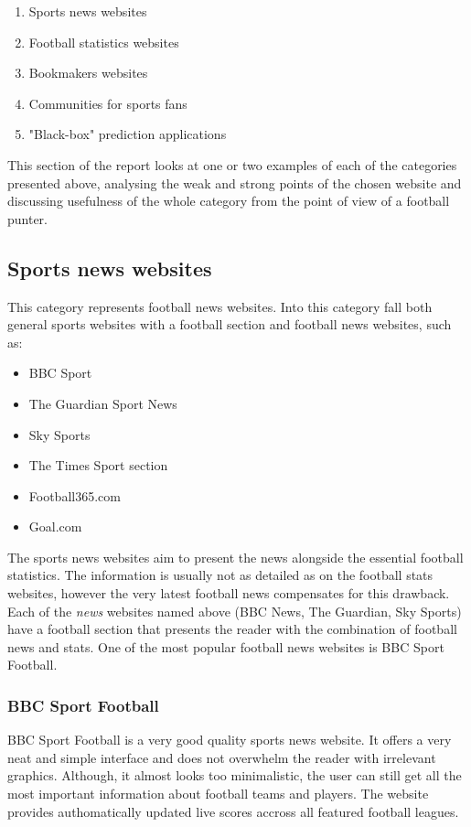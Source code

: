 \begin{enumerate}
	\item Sports news websites
	\item Football statistics websites
	\item Bookmakers websites 
	\item Communities for sports fans
	\item "Black-box" prediction applications
\end{enumerate}

This section of the report looks at one or two examples of each of the categories presented above, analysing the weak and strong points of the chosen website and discussing usefulness of the whole category from the point of view of a football punter.
	
\subsection{Sports news websites}
\label{subsec:sportsnewswebsites_req}
This category represents football news websites. Into this category fall both general sports websites with a football section and football news websites, such as:
	
\begin{itemize}
	 \item BBC Sport \citep{source:bbcsport}
	 \item The Guardian Sport News \citep{source:guardiansport}
	 \item Sky Sports \citep{source:skysports}
	 \item The Times Sport section \citep{source:thetimes}
	 \item Football365.com \citep{source:football365}
	 \item Goal.com \citep{source:goal}
\end{itemize}

The sports news websites aim to present the news alongside the essential football statistics. The information is usually not as detailed as on the football stats websites, however the very latest football news compensates for this drawback. Each of the \emph{news} websites named above (BBC News, The Guardian, Sky Sports) have a football section that presents the reader with the combination of football news and stats.  One of the most popular football news websites is BBC Sport Football.
	
\subsubsection{BBC Sport Football}
\label{subsubsec:bbcsportfootball_req}
BBC Sport Football is a very good quality sports news website. It offers a very neat and simple interface and does not overwhelm the reader with irrelevant graphics. Although, it almost looks too minimalistic, the user can still get all the most important information about football teams and players. The website provides authomatically updated live scores accross all featured football leagues.

